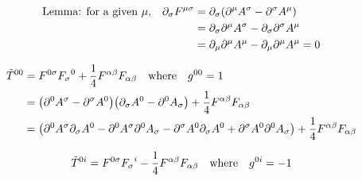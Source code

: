 \documentclass{article}
\begin{document}
\begin{align*}
  \qq*{Lemma: for a given $\mu$,}\partial_\sigma F^{\mu\sigma} & = \partial_\sigma \pqty{\partial^\mu A^\sigma-\partial^\sigma A^\mu}        \\
                                                               & = \partial_\sigma\partial^\mu A^\sigma-\partial_\sigma\partial^\sigma A^\mu \\
                                                               & = \partial_\mu\partial^\mu A^\mu-\partial_\mu\partial^\mu A^\mu=0
\end{align*}

\begin{align*}
  \tilde{T}^{00} & =F^{0\sigma}{F_\sigma}^0+\frac{1}{4}F^{\alpha\beta}F_{\alpha\beta}\qq{where}g^{00}=1                                                                                                                                \\
                 & =\pqty{\partial^0 A^\sigma-\partial^\sigma A^0}\pqty{\partial_\sigma A^0-\partial^0 A_\sigma}+\frac{1}{4}F^{\alpha\beta}F_{\alpha\beta}                                                                             \\
                 & =\pqty{\partial^0 A^\sigma \partial_\sigma A^0-\partial^0 A^\sigma \partial^0 A_\sigma    -\partial^\sigma A^0\partial_\sigma A^0+\partial^\sigma A^0\partial^0 A_\sigma}+\frac{1}{4}F^{\alpha\beta}F_{\alpha\beta} \\
\end{align*}

\begin{align*}
  \tilde{T}^{0i} & =F^{0\sigma}{F_\sigma}^i-\frac{1}{4}F^{\alpha\beta}F_{\alpha\beta}\qq{where}g^{0i}=-1 \\
\end{align*}
\end{document}
